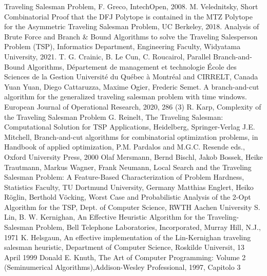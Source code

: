 \documentclass[a4paper,12pt]{report}
\begin{document}
%
%

\begin{thebibliography}{00}
Traveling Salesman Problem, F. Greco, IntechOpen, 2008.
M. Velednitsky, Short Combinatorial Proof that the DFJ Polytope is contained in
the MTZ Polytope for the Asymmetric Traveling Salesman Problem, UC Berkeley, 2018.
%
Analysis of Brute Force and Branch \& Bound Algorithms to solve the Traveling
Salesperson Problem (TSP), Informatics Department, Engineering Faculty, Widyatama University, 2021.
%
T. G. Crainic, B. Le Cun, C. Roucairol, Parallel Branch-and-Bound Algorithms, Département de management et technologie École des Sciences de la Gestion Université du Québec à Montréal and CIRRELT, Canada
Yuan Yuan, Diego Cattaruzza, Maxime Ogier, Frederic Semet. A branch-and-cut algorithm for the generalized traveling salesman problem with time windows. European Journal of Operational Research, 2020, 286 (3)
%
R. Karp, Complexity of the Traveling Salesman Problem
%
G. Reinelt, The Traveling Salesman: Computational Solution for TSP Applications, Heidelberg, Springer-Verlag
J.E. Mitchell, Branch-and-cut algorithms for combinatorial
optimization problems, in Handbook of applied optimization, P.M.
Pardalos and M.G.C. Resende eds., Oxford University Press, 2000
Olaf Mersmann, Bernd Bischl, Jakob Bossek, Heike Trautmann, Markus Wagner, Frank Neumann, Local Search and the Traveling Salesman Problem: A Feature-Based Characterization of Problem Hardness, Statistics Faculty, TU Dortmund University, Germany
Matthias Englert, Heiko Röglin, Berthold Vöcking, Worst Case and Probabilistic Analysis 
of the 2-Opt Algorithm for the TSP, Dept. of Computer Science, RWTH Aachen University
S. Lin, B. W. Kernighan, An Effective Heuristic Algorithm for the Traveling-
Salesman Problem, Bell Telephone Laboratories, Incorporated, Murray Hill, N.J., 1971
K. Helsgaun, An effective implementation of the Lin-Kernighan traveling
salesman heuristic, Department of Computer Science, Roskilde Universit, 13 April 1999
Donald E. Knuth, The Art of Computer Programming: Volume 2 (Seminumerical Algorithms),Addison-Wesley Professional, 1997, Capitolo 3


\end{thebibliography}
% 
\end{document}

